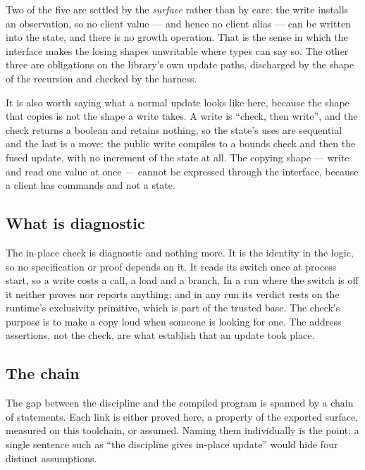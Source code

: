 \documentclass[11pt,a4paper]{article}
\theoremstyle{definition}
\theoremstyle{plain}
\begin{document}
Two of the five are settled by the \emph{surface} rather than by care: the write
installs an observation, so no client value --- and hence no client alias --- can
be written into the state, and there is no growth operation. That is the sense in
which the interface makes the losing shapes unwritable where types can say so.
The other three are obligations on the library's own update paths, discharged by
the shape of the recursion and checked by the harness.

It is also worth saying what a normal update looks like here, because the shape
that copies is not the shape a write takes. A write is ``check, then write'',
and the check returns a boolean and retains nothing, so the state's uses are
sequential and the last is a move: the public write compiles to a bounds check
and then the fused update, with no increment of the state at all. The copying
shape --- write and read one value at once --- cannot be expressed through the
interface, because a client has commands and not a state.

\subsection{What is diagnostic}

The in-place check is diagnostic and nothing more. It is the identity in the
logic, so no specification or proof depends on it. It reads its switch once at
process start, so a write costs a call, a load and a branch. In a run where the
switch is off it neither proves nor reports anything; and in any run its verdict
rests on the runtime's exclusivity primitive, which is part of the trusted base.
The check's purpose is to make a copy loud when someone is looking for one. The
address assertions, not the check, are what establish that an update took place.

\subsection{The chain}

The gap between the discipline and the compiled program is spanned by a chain of
statements. Each link is either proved here, a property of the exported surface,
measured on this toolchain, or assumed. Naming them individually is the point:
a single sentence such as ``the discipline gives in-place update'' would hide
four distinct assumptions.
\end{document}
